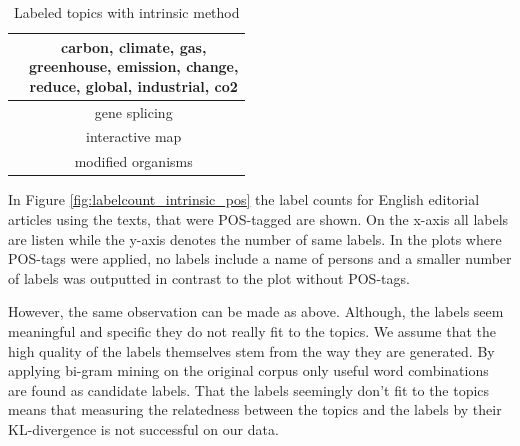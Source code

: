 {\begin{table}[h]
\begin{minipage}[t]{0.5\textwidth}
\begin{tabular}{c|c}
			& \thead{carbon, climate, gas,\\ 	greenhouse, emission, change,\\ 	reduce, 	global, 	industrial, 	co2} \\
			\hline
			& gene splicing  \\
			& interactive map   \\
			& modified organisms\\
		\end{tabular}
	\end{minipage}
	\caption[Labeled topics according with intrinsic method]{Labeled topics with intrinsic method}
	\label{tab:intrinsic_label_pos}
\end{table}

In Figure \ref{fig:labelcount_intrinsic_pos} the label counts for English editorial articles using the texts, that were \ac{POS}-tagged are shown. On the x-axis all labels are listen while the y-axis denotes the number of same labels. 
In the plots where \ac{POS}-tags were applied, no labels include a name of persons and a smaller number of labels was outputted in contrast to the plot without \ac{POS}-tags. 

However, the same observation can be made as above. Although, the labels seem meaningful and specific they do not really fit to the topics. We assume that the high quality of the labels themselves stem from the way they are generated. By applying bi-gram mining on the original corpus only useful word combinations are found as candidate labels. That the labels seemingly don’t fit to the topics means that measuring the relatedness between the topics and the labels by their KL-divergence is not successful on our data.

}
